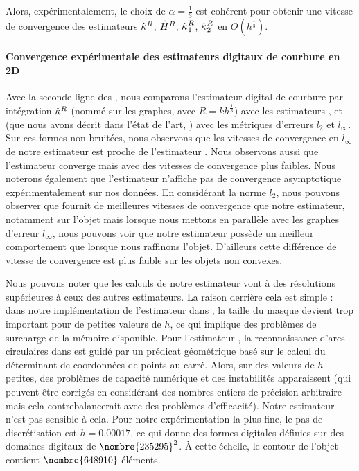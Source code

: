 Alors, expérimentalement, le choix de $\alpha = \frac{1}{3}$ est cohérent pour
obtenir une vitesse de convergence des estimateurs $\hat{\kappa}^{R}$, $\hat{H}^{R}$,
$\hat{\kappa_{}}_{1}^{R}$, $\hat{\kappa_{}}_{2}^{R}$ en $O(h^\frac{1}{3})$.
%
\paragraph{Convergence expérimentale des estimateurs digitaux de courbure en 2D}
%
Avec la seconde ligne des
,
nous comparons l'estimateur digital de courbure par intégration $\hat{\kappa}^{R}$
(nommé \II sur les graphes, avec $R = kh^\frac{1}{3}$) avec les estimateurs \BC
\cite{Esbelin2011}, \MDSS \cite{Coeurjolly2001,deVieilleville2007} et \MDCA
\cite{Roussillon2011} (que nous avons décrit dans l'état de l'art,
) avec les métriques d'erreurs $l_2$ et
$l_\infty$. Sur ces formes non bruitées, nous observons que les vitesses de
convergence en $l_\infty$ de notre estimateur est proche de l'estimateur \MDCA.
Nous observons aussi que l'estimateur \BC converge mais avec des vitesses de
convergence plus faibles. Nous noterons également que l'estimateur \MDSS
n'affiche pas de convergence asymptotique expérimentalement sur nos données. En
considérant la norme $l_2$, nous pouvons observer que \BC fournit de meilleures
vitesses de convergence que notre estimateur, notamment sur l'objet \Ellipse
mais lorsque nous mettons en parallèle avec les graphes d'erreur $l_\infty$,
nous pouvons voir que notre estimateur possède un meilleur comportement que \BC
lorsque nous raffinons l'objet. D'ailleurs cette différence de vitesse de
convergence est plus faible sur les objets non convexes.


Nous pouvons noter que les calculs de notre estimateur vont à des résolutions
supérieures à ceux des autres estimateurs. La raison derrière cela est simple :
dans notre implémentation de l'estimateur \BC dans \DGtal, la taille du masque
devient trop important pour de petites valeurs de $h$, ce qui implique des
problèmes de surcharge de la mémoire disponible. Pour l'estimateur \MDCA, la
reconnaissance d'arcs circulaires dans \DGtal est guidé par un prédicat
géométrique basé sur le calcul du déterminant de coordonnées de points au carré.
Alors, sur des valeurs de $h$ petites, des problèmes de capacité numérique et
des instabilités apparaissent (qui peuvent être corrigés en considérant des
nombres entiers de précision arbitraire mais cela contrebalancerait avec des
problèmes d'efficacité). Notre estimateur n'est pas sensible à cela. Pour notre
expérimentation la plus fine, le pas de discrétisation est $h = 0.00017$, ce qui
donne des formes digitales définies sur des domaines digitaux de $\nombre{235295}^2$. À
cette échelle, le contour de l'objet \Ellipse contient $\nombre{648910}$ éléments.


